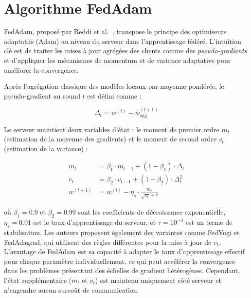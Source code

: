 \documentclass[12pt,a4paper]{report}
\begin{document}
\section{Algorithme FedAdam}

FedAdam, propos\'{e} par Reddi et al.~\cite{reddi2021}, transpose le principe des optimiseurs adaptatifs (Adam) au niveau du serveur dans l'apprentissage f\'{e}d\'{e}r\'{e}. L'intuition cl\'{e} est de traiter les mises \`{a} jour agr\'{e}g\'{e}es des clients comme des \textit{pseudo-gradients} et d'appliquer les m\'{e}canismes de momentum et de variance adaptative pour am\'{e}liorer la convergence.

Apr\`{e}s l'agr\'{e}gation classique des mod\`{e}les locaux par moyenne pond\'{e}r\'{e}e, le pseudo-gradient au round $t$ est d\'{e}fini comme :

\begin{equation}
\Delta_t = w^{(t)} - \bar{w}^{(t+1)}_{\text{agg}}
\label{eq:pseudo_gradient}
\end{equation}

Le serveur maintient deux variables d'\'{e}tat : le moment de premier ordre $m_t$ (estimation de la moyenne des gradients) et le moment de second ordre $v_t$ (estimation de la variance) :

\begin{align}
m_t &= \beta_1 \cdot m_{t-1} + (1 - \beta_1) \cdot \Delta_t \label{eq:fedadam_m} \\
v_t &= \beta_2 \cdot v_{t-1} + (1 - \beta_2) \cdot \Delta_t^2 \label{eq:fedadam_v} \\
w^{(t+1)} &= w^{(t)} - \eta_s \cdot \frac{m_t}{\sqrt{v_t} + \tau} \label{eq:fedadam_update}
\end{align}

o\`{u} $\beta_1 = 0.9$ et $\beta_2 = 0.99$ sont les coefficients de d\'{e}croissance exponentielle, $\eta_s = 0.01$ est le taux d'apprentissage du serveur, et $\tau = 10^{-3}$ est un terme de stabilisation. Les auteurs proposent \'{e}galement des variantes comme FedYogi et FedAdagrad, qui utilisent des r\`{e}gles diff\'{e}rentes pour la mise \`{a} jour de $v_t$. L'avantage de FedAdam est sa capacit\'{e} \`{a} adapter le taux d'apprentissage effectif pour chaque param\`{e}tre individuellement, ce qui peut acc\'{e}l\'{e}rer la convergence dans les probl\`{e}mes pr\'{e}sentant des \'{e}chelles de gradient h\'{e}t\'{e}rog\`{e}nes. Cependant, l'\'{e}tat suppl\'{e}mentaire ($m_t$ et $v_t$) est maintenu uniquement c\^{o}t\'{e} serveur et n'engendre aucun surco\^{u}t de communication.
\end{document}
